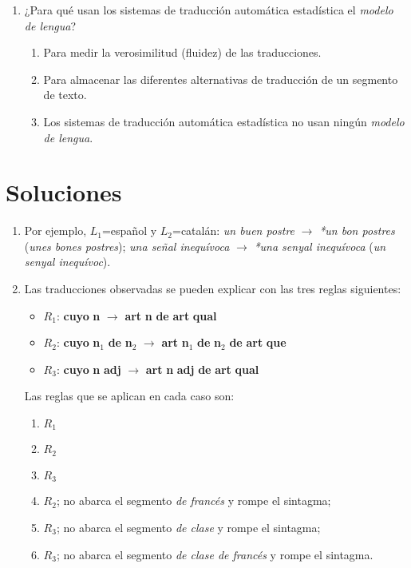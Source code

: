 \begin{enumerate}
\item ¿Para qué usan los sistemas de traducción automática estadística el \emph{modelo de lengua}? \begin{enumerate} \item Para medir la verosimilitud (fluidez) de las traducciones. \item Para almacenar las diferentes alternativas de traducción de un segmento de texto. \item Los sistemas de traducción automática estadística no usan ningún \emph{modelo de lengua}. \end{enumerate} \end{enumerate} 

\section{Soluciones} \begin{enumerate} \item Por ejemplo, $L_1$=español y $L_2$=catalán: \emph{un buen postre} $\rightarrow$ \emph{*un bon postres} (\emph{unes bones postres}); \emph{una señal inequívoca} $\rightarrow$ \emph{*una senyal inequívoca} (\emph{un senyal inequívoc}). 

\item Las traducciones observadas se pueden explicar con las tres reglas siguientes: \begin{itemize} \item $R_1$: {\bf cuyo} {\bf n} $\rightarrow$ {\bf art} {\bf n} {\bf de} {\bf art} {\bf qual} \item $R_2$: {\bf cuyo} {\bf n}$_1$ {\bf de} {\bf n}$_2$ $\rightarrow$ {\bf art} {\bf n}$_1$ {\bf de} {\bf n}$_2$ {\bf de} {\bf art} {\bf que} \item $R_3$: {\bf cuyo} {\bf n} {\bf adj} $\rightarrow$ {\bf art} {\bf n} {\bf adj} {\bf de} {\bf art} {\bf qual} \end{itemize} Las reglas que se aplican en cada caso son: \begin{enumerate} \item $R_1$ \item $R_2$ \item $R_3$ \item $R_2$; no abarca el segmento \emph{de francés} y rompe el sintagma; \item $R_3$; no abarca el segmento \emph{de clase} y rompe el sintagma; \item $R_3$; no abarca el segmento \emph{de clase de francés} y rompe el sintagma. \end{enumerate} 


\end{enumerate}
